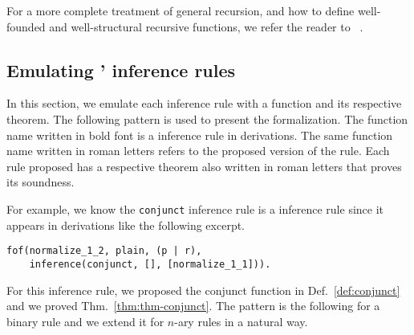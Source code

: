\documentclass[../main.tex]{subfiles}
\begin{document}
For a more complete treatment of general recursion, and how to
define well-founded and well-structural recursive functions, we refer
the reader to \citeauthor{Bove2005}~\cite{Bove2005}.


\subsection{Emulating \Metis' inference rules}
\label{ssec:emulating-inferences}

In this section, we emulate each \Metis inference rule with a
function and its respective theorem.
The following pattern is used to present the formalization.
The function name written in bold font
is a \Metis inference rule in \TSTP derivations.
The same function name written in roman letters refers to the proposed
version of the rule.
Each rule proposed has a respective theorem also written in roman letters
that proves its soundness.

For example, we know the \verb!conjunct! inference rule is a
\Metis inference rule since it appears in \TSTP derivations like
the following excerpt.

\begin{verbatim}
fof(normalize_1_2, plain, (p | r),
    inference(conjunct, [], [normalize_1_1])).
\end{verbatim}

For this inference rule, we proposed the \rm{conjunct} function in
Def.~\ref{def:conjunct} and we proved Thm.~\ref{thm:thm-conjunct}. The pattern is the following for
a binary rule and we extend it for $n$-ary rules in a natural way.
\end{document}
